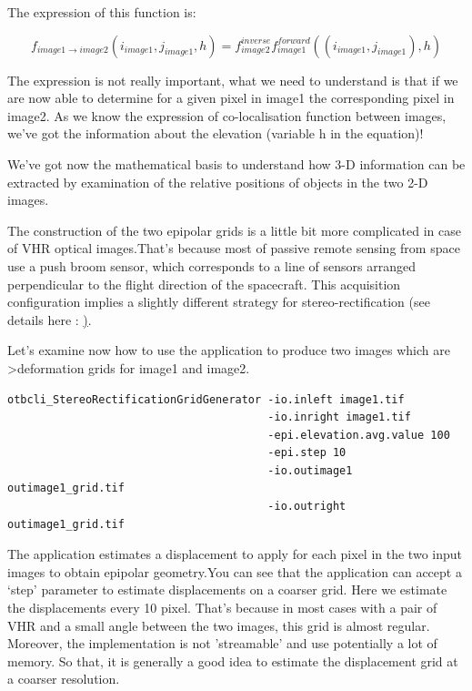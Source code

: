 The expression of this function is:

\begin{equation}
f_{image1 \rightarrow image2} (i_{image1} , j_{image1} , h) =  f^{inverse}_{image2} f^{forward}_{image1}((i_{image1} , j_{image1}), h)
\end{equation}

The expression is not really important, what we need to understand is that if we
are now able to determine for a given pixel in image1 the corresponding pixel in
image2.  As we know the expression of co-localisation function between images,
we've got the information about the elevation (variable h in the equation)!

We've got now the mathematical basis to understand how 3-D information can be
extracted by examination of the relative positions of objects in the two 2-D
images.

The construction of the two epipolar grids is a little bit more complicated in
case of VHR optical images.That's because most of passive remote sensing from
space use a push broom sensor, which corresponds to a line of sensors arranged
perpendicular to the flight direction of the spacecraft. This acquisition
configuration implies a slightly different strategy for stereo-rectification
(see details here :
\href{http://en.wikipedia.org/wiki/Epipolar_geometry#Epipolar_geometry_of_pushbroom_sensor}).

Let's examine now how to use the 
application to produce two images which are \textgreater{deformation grids} for
image1 and image2.

\begin{verbatim}
otbcli_StereoRectificationGridGenerator -io.inleft image1.tif
                                        -io.inright image1.tif
                                        -epi.elevation.avg.value 100
                                        -epi.step 10
                                        -io.outimage1 outimage1_grid.tif
                                        -io.outright outimage1_grid.tif
\end{verbatim}

The application estimates a displacement to apply for each pixel in the two
input images to obtain epipolar geometry.You can see that the application can
accept a `step' parameter to estimate displacements on a coarser grid. Here we
estimate the displacements every 10 pixel. That's because in most cases with a
pair of VHR and a small angle between the two images, this grid is almost
regular.  Moreover, the implementation is not 'streamable' and use potentially a
lot of memory. So that, it is generally a good idea to estimate the displacement
grid at a coarser resolution.

